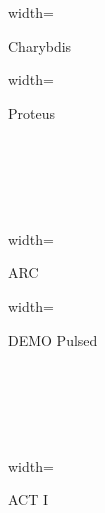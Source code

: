   \label{subsection:scan_T_bar}

\begin{figure*}[h!]
    \centering
    \hfill
    \begin{subfigure}[t]{0.45\textwidth}
        \centering
    \begin{adjustbox}{width=\textwidth}
      \Large
      
    \end{adjustbox}
        \caption{Charybdis}
    \end{subfigure}
    \hfill
    \begin{subfigure}[t]{0.45\textwidth}
        \centering
    \begin{adjustbox}{width=\textwidth}
      \Large
      
    \end{adjustbox}
        \caption{Proteus}
    \end{subfigure}
    \hfill \hfill ~\\ ~\\ ~\\ ~\\
    \hfill
    \begin{subfigure}[t]{0.45\textwidth}
        \centering
    \begin{adjustbox}{width=\textwidth}
      \Large
      
    \end{adjustbox}
        \caption{ARC}
    \end{subfigure}
    \hfill
    \begin{subfigure}[t]{0.45\textwidth}
        \centering
    \begin{adjustbox}{width=\textwidth}
      \Large
      
    \end{adjustbox}
        \caption{DEMO Pulsed}
    \end{subfigure}
    \hfill \hfill ~\\ ~\\ ~\\ ~\\
    \hfill
    \begin{subfigure}[t]{0.45\textwidth}
        \centering
    \begin{adjustbox}{width=\textwidth}
      \Large
      
    \end{adjustbox}
        \caption{ACT I}
    \end{subfigure}

\end{figure*}
